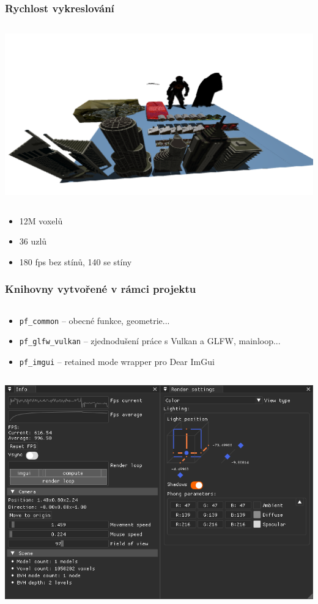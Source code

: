 \documentclass[10pt,xcolor=pdflatex,hyperref={unicode}]{beamer}
\begin{document}
\begin{frame}\frametitle{Rychlost vykreslování}
    \begin{column}{\textwidth}
        \includegraphics[width=\textwidth]{img/big_scene.png}
    \end{column}
    \begin{itemize}
        \item 12M voxelů
        \item 36 uzlů
        \item 180 fps bez stínů, 140 se stíny
    \end{itemize}
\end{frame}

\begin{frame}\frametitle{Knihovny vytvořené v rámci projektu}
    \begin{column}{0.5\textwidth}
        \begin{itemize}
            \item \texttt{pf\_common} -- obecné funkce, geometrie...
            \item \texttt{pf\_glfw\_vulkan} -- zjednodušení práce s Vulkan a GLFW, mainloop...
            \item \texttt{pf\_imgui} -- retained mode wrapper pro Dear ImGui
        \end{itemize}
    \end{column}
    \begin{column}{0.5\textwidth}
        \includegraphics[width=\textwidth]{img/pf_imgui.png}
    \end{column}
\end{frame}
\end{document}
